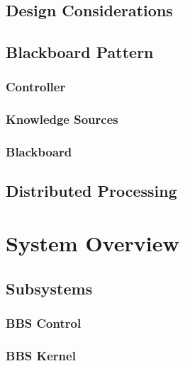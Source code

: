 \documentclass[10pt]{lofar}
\begin{document}
\subsection{Design Considerations}
\label{subsec:considerations}

\subsection{Blackboard Pattern}
\label{subsec:blackboard}

\subsubsection{Controller}
\label{subsubsec:controller}

\subsubsection{Knowledge Sources}
\label{subsubsec:ks}

\subsubsection{Blackboard}
\label{subsubsec:bb}

\subsection{Distributed Processing}
\label{subsec:distributed}

\pagebreak

\section{System Overview}
\label{sec:overview}

\subsection{Subsystems}
\label{subsec:subsystems}

\subsubsection{BBS Control}
\label{subsubsec:sys-control}

\subsubsection{BBS Kernel}
\label{subsubsec:sys-kernel}
\end{document}

